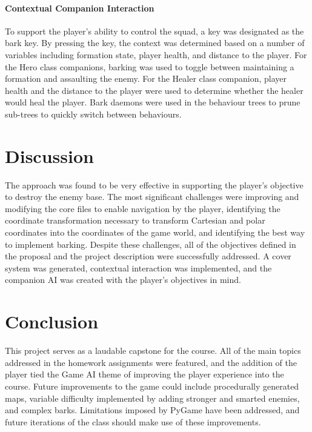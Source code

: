 \documentclass[11pt]{article}
\begin{document}
\paragraph{Contextual Companion Interaction}
To support the player's ability to control the squad, a key was designated as the bark key. By pressing the key, the context was determined based on a number of variables including formation state, player health, and distance to the player. For the Hero class companions, barking was used to toggle between maintaining a formation and assaulting the enemy. For the Healer class companion, player health and the distance to the player were used to determine whether the healer would heal the player. Bark daemons were used in the behaviour trees to prune sub-trees to quickly switch between behaviours. 

\section{Discussion}
The approach was found to be very effective in supporting the player's objective to destroy the enemy base. The most significant challenges were improving and modifying the core files to enable navigation by the player, identifying the coordinate transformation necessary to transform Cartesian and polar coordinates into the coordinates of the game world, and identifying the best way to implement barking. Despite these challenges, all of the objectives defined in the proposal and the project description were successfully addressed. A cover system was generated, contextual interaction was implemented, and the companion AI was created with the player's objectives in mind.

\section{Conclusion}
This project serves as a laudable capstone for the course. All of the main topics addressed in the homework assignments were featured, and the addition of the player tied the Game AI theme of improving the player experience into the course. Future improvements to the game could include procedurally generated maps, variable difficulty implemented by adding stronger and smarted enemies, and complex barks. Limitations imposed by PyGame have been addressed, and future iterations of the class should make use of these improvements.
\end{document}
